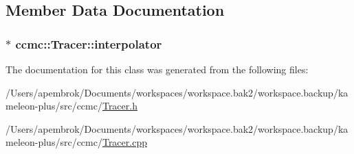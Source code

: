 \subsection{Member Data Documentation}
\hypertarget{classccmc_1_1_tracer_ae7a4953e9ca43eb93535b869864f6062}{
\subsubsection[{interpolator}]{$\ast$ ccmc\-::\-Tracer\-::interpolator}}\label{classccmc_1_1_tracer_ae7a4953e9ca43eb93535b869864f6062}


The documentation for this class was generated from the following files\-:\begin{DoxyCompactItemize}
\item 
/\-Users/apembrok/\-Documents/workspaces/workspace.\-bak2/workspace.\-backup/kameleon-\/plus/src/ccmc/\hyperlink{_tracer_8h}{Tracer.\-h}\item 
/\-Users/apembrok/\-Documents/workspaces/workspace.\-bak2/workspace.\-backup/kameleon-\/plus/src/ccmc/\hyperlink{_tracer_8cpp}{Tracer.\-cpp}\end{DoxyCompactItemize}
